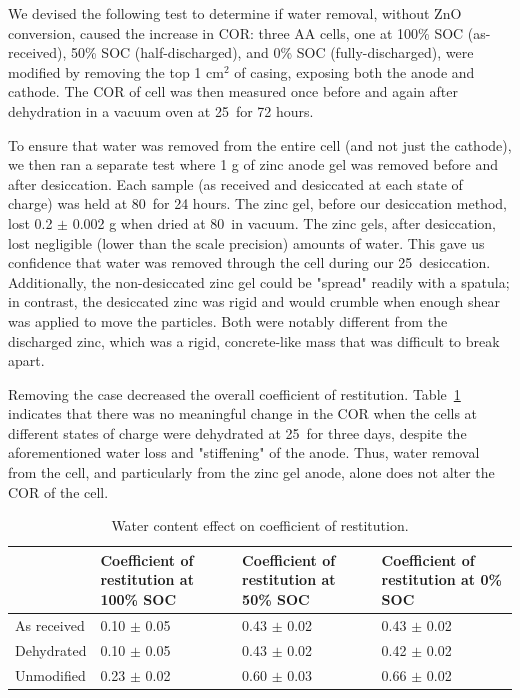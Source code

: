 {We devised the following test to determine if water removal, without ZnO conversion, caused the increase in COR:  three AA cells, one at 100\% SOC (as-received), 50\% SOC (half-discharged), and 0\% SOC (fully-discharged), were modified by removing the top 1 cm$^2$ of casing, exposing both the anode and cathode.  The COR of cell was then measured once before and again after dehydration in a vacuum oven at 25\celsius~for 72 hours.

To ensure that water was removed from the entire cell (and not just the cathode), we then ran a separate test where 1 g of zinc anode gel was removed before and after desiccation. Each sample (as received and desiccated at each state of charge) was held at 80\celsius~for 24 hours. The zinc gel, before our desiccation method, lost 0.2 $\pm$ 0.002 g when dried at 80\celsius~in vacuum. The zinc gels, after desiccation, lost negligible (lower than the scale precision) amounts of water.  This gave us confidence that water was removed through the cell during our 25\celsius~desiccation. Additionally, the non-desiccated zinc gel could be "spread" readily with a spatula; in contrast, the desiccated zinc was rigid and would crumble when enough shear was applied to move the particles. Both were notably different from the discharged zinc, which was a rigid, concrete-like mass that was difficult to break apart. 

Removing the case decreased the overall coefficient of restitution. Table~\ref{tab:cortable} indicates that there was no meaningful change in the COR when the cells at different states of charge were dehydrated at 25\celsius~for three days, despite the aforementioned water loss and "stiffening" of the anode. Thus, water removal from the cell, and particularly from the zinc gel anode, alone does not alter the COR of the cell.


\begin{table}[htb]
\centering
 \caption{\label{tab:cortable}Water content effect on coefficient of restitution.}
  \begin{tabular}{p{2.5cm}p{2.5cm}p{2.5cm}p{2.5cm}}
    \hline
    & Coefficient of restitution at 100\% SOC & Coefficient of restitution at 50\% SOC & Coefficient of restitution at 0\% SOC\\
    \hline
        As received & 0.10 $\pm$ 0.05 & 0.43 $\pm$ 0.02 & 0.43 $\pm$ 0.02\\
        Dehydrated & 0.10 $\pm$ 0.05 & 0.43 $\pm$ 0.02 & 0.42 $\pm$ 0.02\\
        Unmodified & 0.23 $\pm$ 0.02 & 0.60 $\pm$ 0.03 & 0.66 $\pm$ 0.02\\
  \end{tabular}
\end{table}

}
